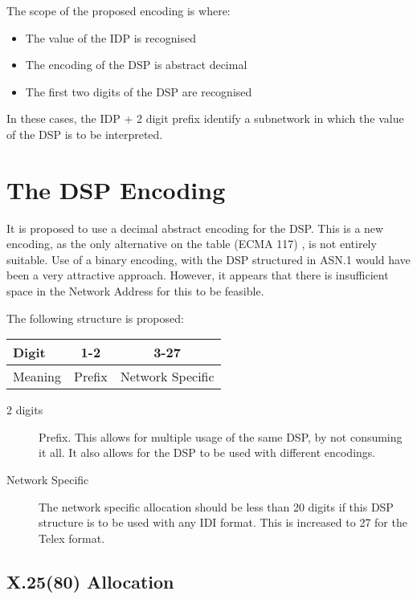 The scope of the proposed encoding is where:

\begin {itemize}
\item The value of the IDP is recognised
\item The encoding of the DSP is abstract decimal
\item The first two digits of the DSP are recognised
\end {itemize}

In these cases, the IDP + 2 digit prefix identify a subnetwork in which the
value of the DSP is to be interpreted.

\section {The DSP Encoding}

It is proposed to use a decimal abstract encoding for the DSP.  This
is a new encoding, as the only alternative on the table (ECMA 117)
\cite{ECMA.117},
is not entirely suitable.  Use of a binary
encoding, with the DSP structured in ASN.1 would have been a very
attractive approach.  However, it appears that there is insufficient
space in the Network Address for this to be feasible.  

The following structure is proposed:

\begin {center}
\begin {tabular}{|l||c|c|}
\hline
Digit   & 1-2     & 3-27 \\
\hline
Meaning  & Prefix & Network Specific \\
\hline
\end {tabular}
\end {center}

\begin {description}
\item [2 digits] Prefix.  This allows for multiple usage of the same DSP, by
not consuming it all.  It also allows for the DSP to be used with different
encodings.

\item [Network Specific]

The network specific allocation should be less than 20 digits if
this DSP structure is to be used with any IDI format.  This is
increased to 27 for the Telex format.


\end {description}

\subsection {X.25(80) Allocation}

